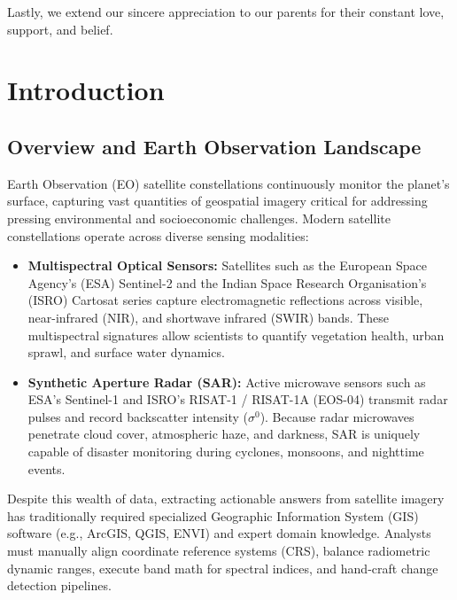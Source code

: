 \documentclass[12pt,a4paper]{report}
\begin{document}
Lastly, we extend our sincere appreciation to our parents for their constant love, support, and belief.
\clearpage

\clearpage
{}
\tableofcontents
\clearpage
{}
\listoffigures
\clearpage

\setcounter{page}{1}

\chapter{Introduction}

\section{Overview and Earth Observation Landscape}
Earth Observation (EO) satellite constellations continuously monitor the planet's surface, capturing vast quantities of geospatial imagery critical for addressing pressing environmental and socioeconomic challenges. Modern satellite constellations operate across diverse sensing modalities:
\begin{itemize}
    \item \textbf{Multispectral Optical Sensors:} Satellites such as the European Space Agency's (ESA) Sentinel-2 and the Indian Space Research Organisation's (ISRO) Cartosat series capture electromagnetic reflections across visible, near-infrared (NIR), and shortwave infrared (SWIR) bands. These multispectral signatures allow scientists to quantify vegetation health, urban sprawl, and surface water dynamics.
    \item \textbf{Synthetic Aperture Radar (SAR):} Active microwave sensors such as ESA's Sentinel-1 and ISRO's RISAT-1 / RISAT-1A (EOS-04) transmit radar pulses and record backscatter intensity ($\sigma^0$). Because radar microwaves penetrate cloud cover, atmospheric haze, and darkness, SAR is uniquely capable of disaster monitoring during cyclones, monsoons, and nighttime events.
\end{itemize}

Despite this wealth of data, extracting actionable answers from satellite imagery has traditionally required specialized Geographic Information System (GIS) software (e.g., ArcGIS, QGIS, ENVI) and expert domain knowledge. Analysts must manually align coordinate reference systems (CRS), balance radiometric dynamic ranges, execute band math for spectral indices, and hand-craft change detection pipelines.
\end{document}
